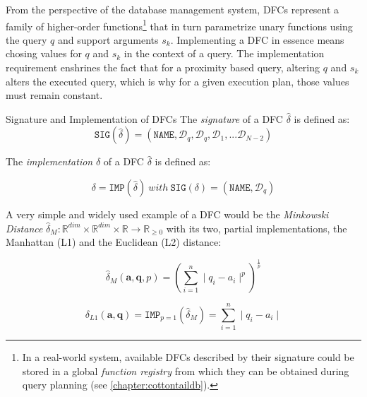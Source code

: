 From the perspective of the database management system, DFCs represent a family of higher-order functions\footnote{In a real-world system, available DFCs described by their signature could be stored in a global \emph{function registry} from which they can be obtained during query planning (see \cref{chapter:cottontaildb}).} that in turn parametrize unary functions using the query $q$ and support arguments $s_k$. Implementing a DFC in essence means chosing values for $q$ and $s_k$ in the context of a query. The implementation requirement enshrines the fact that for a proximity based query, altering $q$ and $s_k$ alters the executed query, which is why for a given execution plan, those values must remain constant.

\begin{definition}[label=definition:dfc_sig_imp]{Signature and Implementation of DFCs}{}    
    The \emph{signature} of a DFC $\hat{\delta}$ is defined as:
    \begin{equation}
        \label{equation:dfc_signature}
        \texttt{SIG}(\hat{\delta}) = (\mathtt{NAME}, \mathcal{D}_q, \mathcal{D}_q, \mathcal{D}_1,... \mathcal{D}_{N-2})
    \end{equation}

    The \emph{implementation} $\delta$ of a DFC $\hat{\delta}$ is defined as:

    \begin{equation}
        \label{equation:dfc_implementation}
        \delta = \texttt{IMP}(\hat{\delta}) \: with \: \texttt{SIG}(\delta) = (\mathtt{NAME}, \mathcal{D}_q)
    \end{equation}
\end{definition}

A very simple and widely used example of a DFC would be the \emph{Minkowski Distance} $\hat{\delta}_{M} \colon \mathbb{R}^{dim} \times \mathbb{R}^{dim} \times \mathbb{R} \to \mathbb{R}_{\geq 0}$ with its two, partial implementations, the Manhattan (L1) and the Euclidean (L2) distance:

\begin{equation}
    \hat{\delta}_{M}(\mathbf{a},\mathbf{q},p) = \left(\sum_{i=1}^{n} \mid q_i - a_i \mid^p\right)^{\frac{1}{p}}
\end{equation}

\begin{equation}
    \delta_{L1}(\mathbf{a},\mathbf{q}) = \texttt{IMP}_{p=1}(\hat{\delta}_M) = \sum_{i=1}^{n} \mid q_i - a_i \mid
\end{equation}


